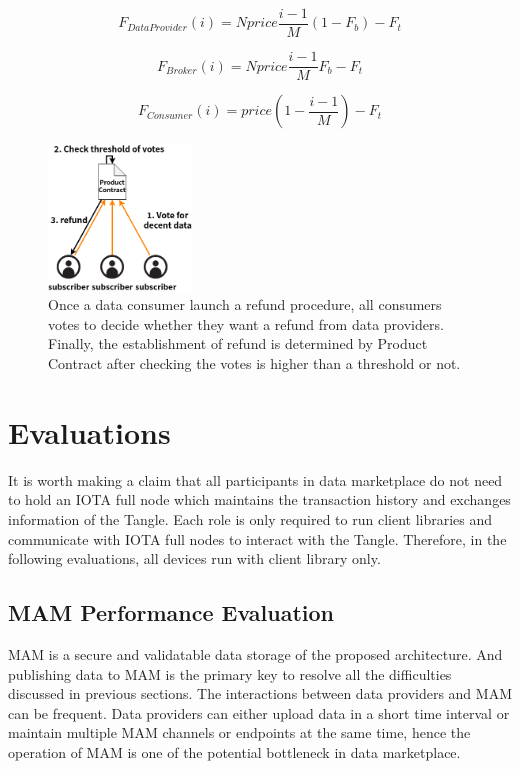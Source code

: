 \documentclass[conference]{IEEEtran}
\begin{document}
\begin{equation}
    F_{DataProvider}(i) = Nprice \frac{i-1}{M} (1-F_{b}) -F_{t}
\end{equation}

\begin{equation}
    F_{Broker}(i) = Nprice \frac{i-1}{M} F_{b} -F_{t}
\end{equation}

\begin{equation}
    F_{Consumer}(i) = price (1-\frac{i-1}{M}) -F_{t}
\end{equation}

\begin{figure}[h]
    \centering
    \includegraphics[width=1.5in]{refund}
    \caption{Once a data consumer launch a refund procedure, all consumers votes to decide whether they want a refund from data providers. Finally, the establishment of refund is determined by Product Contract after checking the votes is higher than a threshold or not.}
    \label{fig:refund}
\end{figure}


\section{Evaluations}
It is worth making a claim that all participants in data marketplace do not need to hold an IOTA full node which maintains the transaction history and exchanges information of the Tangle. Each role is only required to run client libraries and communicate with IOTA full nodes to interact with the Tangle. Therefore, in the following evaluations, all devices run with client library only.

\subsection{MAM Performance Evaluation}
\label{section:mam_performance}
MAM is a secure and validatable data storage of the proposed architecture. And publishing data to MAM is the primary key to resolve all the difficulties discussed in previous sections. The interactions between data providers and MAM can be frequent. Data providers can either upload data in a short time interval or maintain multiple MAM channels or endpoints at the same time, hence the operation of MAM is one of the potential bottleneck in data marketplace.
\end{document}
